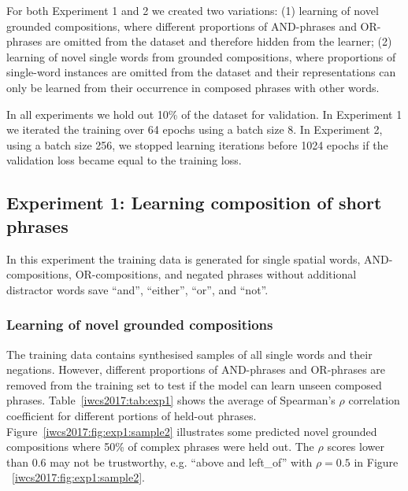 For both Experiment 1 and 2 we created two variations:
(1) learning of novel grounded compositions, where different
proportions of AND-phrases and OR-phrases are omitted from the dataset and
therefore hidden from the learner;
(2) learning of novel single words from grounded compositions, where
proportions of single-word instances are omitted from the dataset and their
representations can only be learned from their occurrence in
composed phrases with other words.

In all experiments we hold out 10\%  of the dataset for validation. In
Experiment 1 we iterated the training over 64 epochs using a batch size 8. In
Experiment 2, using a batch size 256, we stopped learning iterations before
1024 epochs if the validation loss became equal to the training loss.

\subsection{Experiment 1: Learning composition of short phrases}

In this experiment the training data is generated for single spatial words,
AND-compositions, OR-compositions, and negated phrases without additional distractor words save ``and'', ``either'', ``or'', and ``not''.

\subsubsection{Learning of novel grounded compositions}

The training data contains synthesised samples of all single words
and their negations. However, different proportions of AND-phrases and
OR-phrases are removed from the training set to test if the model can learn unseen
composed phrases. Table~\ref{iwcs2017:tab:exp1} shows the average of Spearman's
$\rho$ correlation coefficient for different portions of held-out phrases.
Figure~\ref{iwcs2017:fig:exp1:sample2} illustrates some predicted novel grounded
compositions where 50\% of complex phrases were held out. The $\rho$
scores lower than 0.6 may not be trustworthy, e.g. ``above and left\_of'' with
$\rho=0.5$ in Figure ~\ref{iwcs2017:fig:exp1:sample2}.

